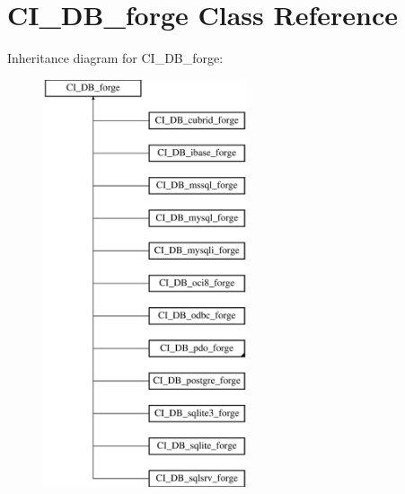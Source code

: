 \hypertarget{class_c_i___d_b__forge}{}\section{C\+I\+\_\+\+D\+B\+\_\+forge Class Reference}
\label{class_c_i___d_b__forge}
Inheritance diagram for C\+I\+\_\+\+D\+B\+\_\+forge\+:\begin{figure}[H]
\begin{center}
\leavevmode
\includegraphics[height=12.000000cm]{class_c_i___d_b__forge}
\end{center}
\end{figure}
